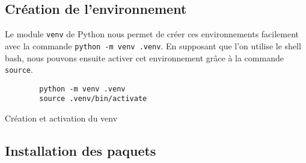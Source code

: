 \documentclass{article}
\begin{document}
        \subsection{Création de l'environnement}
        Le module \verb|venv| de Python nous permet de créer ces environnements facilement avec la commande \verb|python -m venv .venv|. En supposant que l'on utilise le shell bash, nous pouvons ensuite activer cet environnement grâce à la commande \verb|source|.
        \begin{listing}[H]
            \begin{verbatim}
        python -m venv .venv
        source .venv/bin/activate
            \end{verbatim}
            \caption{Création et activation du venv}
            \label{code:creation-venv}
        \end{listing}

        \subsection{Installation des paquets}
\end{document}
